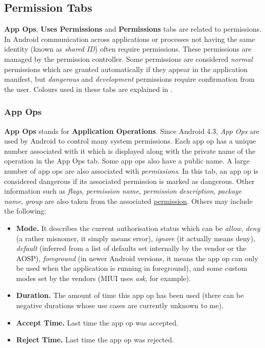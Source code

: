 \subsection{Permission Tabs}\label{subsec:permission-tabs} %
\textbf{App Ops}, \textbf{Uses Permissions} and \textbf{Permissions} tabs are related to permissions. In Android
communication across applications or processes not having the same identity (known as \textit{shared ID}) often
require permissions. These permissions are managed by the permission controller. Some permissions are considered
\textit{normal} permissions which are granted automatically if they appear in the application manifest, but
\textit{dangerous} and \textit{development} permissions require confirmation from the user. Colours used in these tabs
are explained in .

\subsubsection{App Ops}\label{subsubsec:app-ops} %
\textbf{App Ops} stands for \textbf{Application Operations}. Since Android 4.3, \textit{App Ops} are used by Android to
control many system permissions. Each app op has a unique number associated with it which is displayed along with the
private name of the operation in the App Ops tab. Some app ops also have a public name. A large number of app ops are
also associated with \textit{permissions}. In this tab, an app op is considered dangerous if its associated permission
is marked as dangerous. Other information such as \textit{flags}, \textit{permission name}, \textit{permission description},
\textit{package name}, \textit{group} are also taken from the associated \hyperref[subsubsec:permissions]{permission}.
Others may include the following:
\begin{itemize}
    \item \textbf{Mode.} It describes the current authorisation status which can be \textit{allow}, \textit{deny} (a
    rather misnomer, it simply means error), \textit{ignore} (it actually means deny), \textit{default} (inferred from
    a list of defaults set internally by the vendor or the AOSP), \textit{foreground} (in newer Android versions, it
    means the app op can only be used when the application is running in foreground), and some custom modes set by the
    vendors (MIUI uses \textit{ask}, for example).

    \item \textbf{Duration.} The amount of time this app op has been used (there can be negative durations whose
    use cases are currently unknown to me).

    \item \textbf{Accept Time.} Last time the app op was accepted.

    \item \textbf{Reject Time.} Last time the app op was rejected.
\end{itemize}

